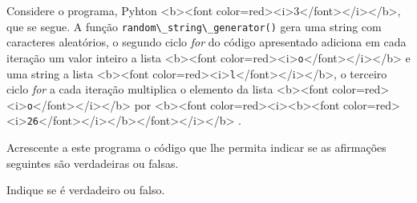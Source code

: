 \documentclass[12pt,varwidth=16cm,border=1pt]{standalone}
\begin{document}
Considere o programa, Pyhton <b><font color=red><i>3</font></i></b>, que se segue. A função \verb+random\_string\_generator()+ gera uma string com caracteres aleatórios, o segundo ciclo \textit{for} do código apresentado adiciona em cada iteração um valor inteiro a lista <b><font color=red><i>\verb+o+</font></i></b> e uma string a lista <b><font color=red><i>\verb+l+</font></i></b>, o terceiro ciclo \textit{for} a cada iteração multiplica o elemento da lista <b><font color=red><i>\verb+o+</font></i></b> por <b><font color=red><i><b><font color=red><i>\verb+26+</font></i></b></font></i></b> .



Acrescente a este programa o código que lhe permita indicar se as
afirmações seguintes são verdadeiras ou falsas.

Indique se é verdadeiro ou falso.
\end{document}
